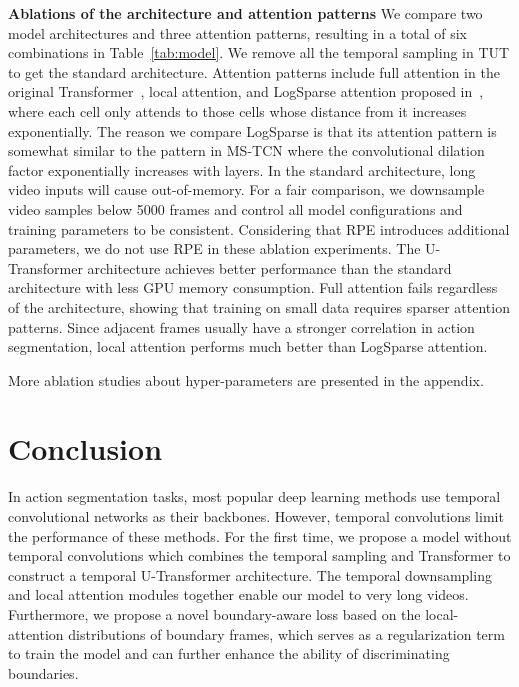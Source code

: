 \documentclass[letterpaper]{article} \usepackage[submission]{aaai23}  \usepackage{times}  \usepackage{helvet}  \usepackage{courier}  \usepackage[hyphens]{url}  \usepackage{graphicx} \urlstyle{rm} \def\UrlFont{\rm}  \usepackage{natbib}  \usepackage{caption} \frenchspacing  \setlength{\pdfpagewidth}{8.5in} \setlength{\pdfpageheight}{11in} \usepackage{algorithm}
\begin{document}
{\bf Ablations of the architecture and attention patterns}\quad
We compare two model architectures and three attention patterns, resulting in a total of six combinations in Table~\ref{tab:model}. We remove all the temporal sampling in TUT to get the standard architecture. Attention patterns include full attention in the original Transformer~\cite{Transformer}, local attention, and LogSparse attention proposed in~\cite{ConvTransformer}, where each cell only attends to those cells whose distance from it increases exponentially. The reason we compare LogSparse is that its attention pattern is somewhat similar to the pattern in MS-TCN where the convolutional dilation factor exponentially increases with layers. In the standard architecture, long video inputs will cause out-of-memory. For a fair comparison, we downsample video samples below 5000 frames and control all model configurations and training parameters to be consistent. Considering that RPE introduces additional parameters, we do not use RPE in these ablation experiments. The U-Transformer architecture achieves better performance than the standard architecture with less GPU memory consumption. Full attention fails regardless of the architecture, showing that training on small data requires sparser attention patterns. Since adjacent frames usually have a stronger correlation in action segmentation, local attention performs much better than LogSparse attention.

More ablation studies about hyper-parameters are presented in the appendix.






\section{Conclusion}
In action segmentation tasks, most popular deep learning methods use temporal convolutional networks as their backbones. However, temporal convolutions limit the performance of these methods. For the first time, we propose a model without temporal convolutions which combines the temporal sampling and Transformer to construct a temporal U-Transformer architecture. The temporal downsampling and local attention modules together enable our model to very long videos. Furthermore, we propose a novel boundary-aware loss based on the local-attention distributions of boundary frames, which serves as a regularization term to train the model and can further enhance the ability of discriminating boundaries.
\end{document}
